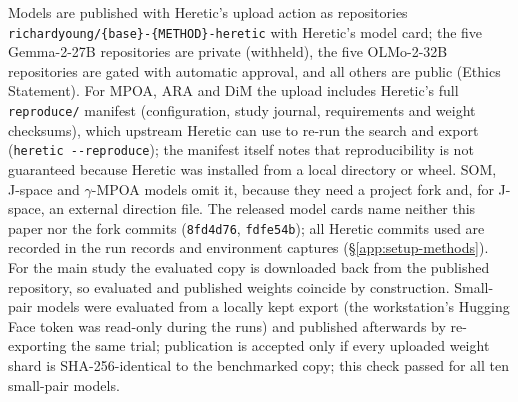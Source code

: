 Models are published with Heretic's upload action as repositories
\texttt{richardyoung/\{base\}-\{METHOD\}-heretic} with Heretic's model card;
the five Gemma-2-27B repositories are private (withheld), the five OLMo-2-32B
repositories are gated with automatic approval, and all others are public
(Ethics Statement).
For MPOA, ARA and DiM the upload includes Heretic's full \texttt{reproduce/}
manifest (configuration, study journal, requirements and weight checksums),
which upstream Heretic can use to re-run the search and export
(\texttt{heretic -{}-reproduce}); the manifest itself notes that reproducibility
is not guaranteed because Heretic was installed from a local directory or
wheel. SOM, J-space and $\gamma$-MPOA models omit it, because they need a
project fork and, for J-space, an external direction file. The released model
cards name neither this paper nor the fork commits (\texttt{8fd4d76},
\texttt{fdfe54b}); all Heretic commits used are recorded in the run records
and environment captures (\S\ref{app:setup-methods}).
For the main study the evaluated copy is downloaded back from the published
repository, so evaluated and published weights coincide by construction. Small-pair models were
evaluated from a locally kept export (the workstation's Hugging Face token was
read-only during the runs) and published afterwards by re-exporting the same
trial; publication is accepted only if every uploaded weight shard is
SHA-256-identical to the benchmarked copy; this check passed for all ten
small-pair models.
